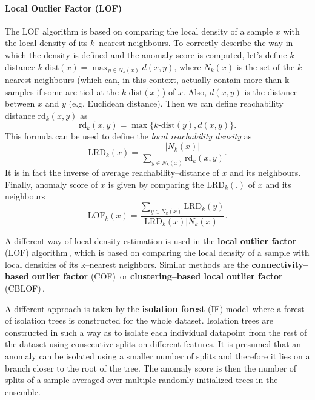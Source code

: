 \paragraph{Local Outlier Factor (LOF)}
The LOF algorithm \cite{breunig2000lof} is based on comparing the local density of a sample $x$ with the local density of its $k$--nearest neighbours. To correctly describe the way in which the density is defined and the anomaly score is computed, let's define $k$-distance $k\text{-dist}(x)=\max_{y \in N_k(x)} d(x,y)$, where $N_k(x)$ is the set of the $k$--nearest neighbours (which can, in this context, actually contain more than k samples if some are tied at the $k$-dist$(x)$) of $x$. Also, $d(x,y)$ is the distance between $x$ and $y$ (e.g. Euclidean distance). Then we can define reachability distance $\text{rd}_k(x,y)$ as $$\text{rd}_k(x,y)=\max \lbrace k\text{-dist}(y), d(x,y) \rbrace.$$ This formula can be used to define the \textit{local reachability density} as 
\begin{equation}
  \text{LRD}_k(x)=\frac{|N_k(x)|}{\sum_{y\in N_k(x)}\text{rd}_k(x,y)}.
\end{equation}
It is in fact the inverse of average reachability--distance of $x$ and its neighbours. Finally, anomaly score of $x$ is given by comparing the $\text{LRD}_k(.)$ of $x$ and its neighbours 
\begin{equation}
  \text{LOF}_k(x)=\frac{\sum_{y\in N_k(x)} \text{LRD}_k(y)}{\text{LRD}_k(x) |N_k(x)|}.
\end{equation}




A different way of local density estimation is used in the \textbf{local
outlier factor} (LOF) algorithm\,\cite{breunig2000lof}, which is
based on comparing the local density of a sample with local densities
of its k--nearest neighbors. Similar methods are the \textbf{connectivity--based
outlier factor} (COF)\,\cite{tang2002enhancing} or \textbf{clustering--based
local outlier factor} (CBLOF)\,\cite{he2003discovering}.

A different approach is taken by the \textbf{isolation forest }(IF)
model\,\cite{liu2008isolation} where a forest of isolation trees
is constructed for the whole dataset. Isolation trees are constructed
in such a way as to isolate each individual datapoint from the rest
of the dataset using consecutive splits on different features. It
is presumed that an anomaly can be isolated using a smaller number
of splits and therefore it lies on a branch closer to the root of
the tree. The anomaly score is then the number of splits of a sample
averaged over multiple randomly initialized trees in the ensemble.

